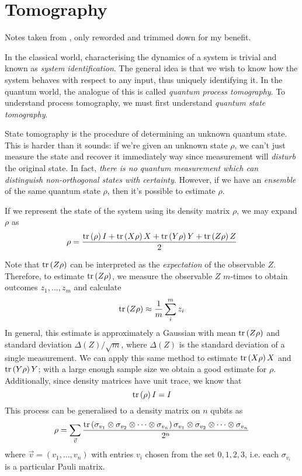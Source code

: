 \section{Tomography}

Notes taken from \cite{nielsen_quantum_2011}, only reworded and trimmed down for my benefit.

In the classical world, characterising the dynamics of a system is trivial and known as
\textit{system identification}. The general idea is that we wish to know how the system behaves with
respect to any input, thus uniquely identifying it. In the quantum world, the analogue of this is
called \textit{quantum process tomography}. To understand process tomography, we must first
understand \textit{quantum state tomography}.

State tomography is the procedure of determining an unknown quantum state. This is harder than it
sounds: if we're given an unknown state $\rho$, we can't just measure the state and recover it
immediately way since measurement will \textit{disturb} the original state. In fact, \textit{there
is no quantum measurement which can distinguish non-orthogonal states with certainty}. However, if
we have an \textit{ensemble} of the same quantum state $\rho$, then it's possible to estimate
$\rho$.

If we represent the state of the system using its density matrix $\rho$, we may expand $\rho$ as
\begin{equation}
    \rho = \frac{\text{tr}\left(\rho\right)I + \text{tr}\left(X\rho\right)X + \text{tr}\left(Y\rho\right)Y + \text{tr}\left(Z\rho\right)Z}
                {2}
\end{equation}

Note that $\text{tr}\left(Z\rho\right)$ can be interpreted as the \textit{expectation} of the observable $Z$.
Therefore, to estimate $\text{tr}\left(Z\rho\right)$, we measure the observable $Z$ $m$-times to obtain outcomes
$z_1, \dots, z_m$ and calculate
\begin{equation}
    \text{tr}\left(Z\rho\right) \approx \frac{1}{m} \sum_i^m z_i
\end{equation}
In general, this estimate is approximately a Gaussian with mean $\text{tr}\left(Z\rho\right)$ and standard deviation
$\Delta(Z) / \sqrt{m}$, where $\Delta(Z)$ is the standard deviation of a single measurement. We can
apply this same method to estimate $\text{tr}\left(X\rho\right)X$ and $\text{tr}\left(Y\rho\right)Y$; with a large enough sample size
we obtain a good estimate for $\rho$. Additionally, since density matrices have unit trace, we know
that
\begin{equation}
    \text{tr}\left(\rho\right) I = I
\end{equation}
This process can be generalised to a density matrix on $n$ qubits as
\begin{equation}
    \rho = \sum_{\vec{v}} \frac{\text{tr}\left(\sigma_{v_1} \otimes \sigma_{v_2} \otimes \dots \otimes \sigma_{v_n}\right) \sigma_{v_1} \otimes \sigma_{v_2} \otimes \dots \otimes \sigma_{v_n}}{2^n}
\end{equation}
where $\vec{v} = \left(v_1, \dots, v_n\right)$ with entries $v_i$ chosen from the set $0, 1, 2, 3$,
i.e. each $\sigma_{v_i}$ is a particular Pauli matrix.



